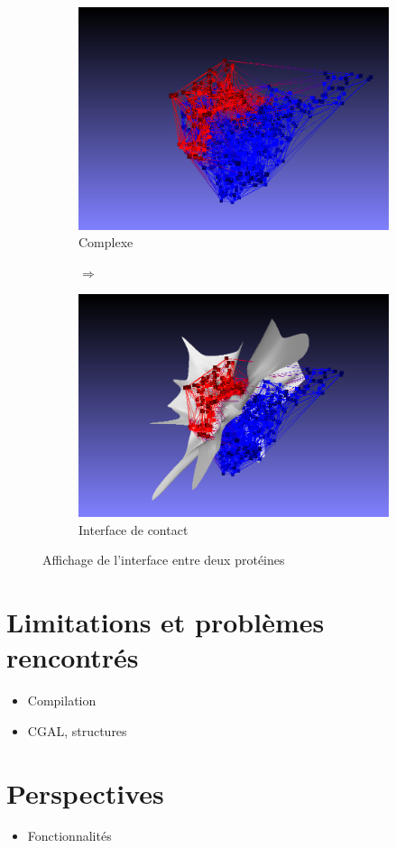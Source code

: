 \begin{figure}[ht]
\centering
\begin{subfigure}{0.45\textwidth}
  \centering
  \includegraphics[width=\textwidth]{figures/final_no_surf.png}
  \caption{Complexe}
  \label{fig::complexe}
\end{subfigure}%
\begin{subfigure}{0.1\textwidth}
  \centering
  $\Longrightarrow$
\end{subfigure}%
\begin{subfigure}{0.45\textwidth}
  \centering
  \includegraphics[width=\textwidth]{figures/final_with_surf.png}
  \caption{Interface de contact}
  \label{fig::interface}
\end{subfigure}
\caption{Affichage de l'interface entre deux protéines}
\label{fig::affichage_final}
\end{figure}
\section{Limitations et problèmes rencontrés}
\begin{itemize}
  \item Compilation
  \item CGAL, structures
\end{itemize}

\section{Perspectives}
\begin{itemize}
  \item Fonctionnalités
\end{itemize}
